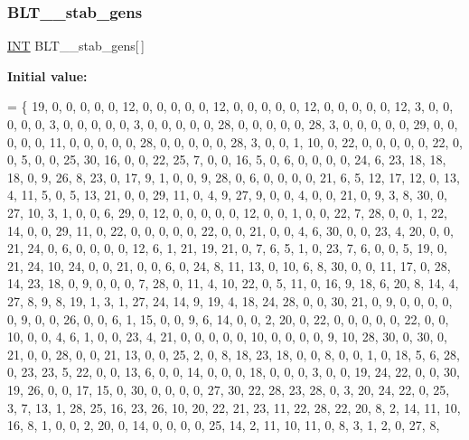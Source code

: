 \subsubsection{\texorpdfstring{B\+L\+T\+\_\+\_\+stab\+\_\+gens}{BLT\_31\_stab\_gens}}
{\footnotesize\ttfamily \mbox{\hyperlink{galois_8h_a09fddde158a3a20bd2dcadb609de11dc}{I\+NT}} B\+L\+T\+\_\+\_\+stab\+\_\+gens\mbox{[}$\,$\mbox{]}}

{\bfseries Initial value\+:}
\begin{DoxyCode}
= \{
19,  0,  0,  0,  0,  0, 12,  0,  0,  0,  0,  0, 12,  0,  0,  0,  0,  0, 12,  0,  0,  0,  0,  0, 12, 
 3,  0,  0,  0,  0,  0,  3,  0,  0,  0,  0,  0,  3,  0,  0,  0,  0,  0, 28,  0,  0,  0,  0,  0, 28, 
 3,  0,  0,  0,  0,  0, 29,  0,  0,  0,  0,  0, 11,  0,  0,  0,  0,  0, 28,  0,  0,  0,  0,  0, 28, 
 3,  0,  0,  1, 10,  0, 22,  0,  0,  0,  0,  0, 22,  0,  0,  5,  0,  0, 25, 30, 16,  0,  0, 22, 25, 
 7,  0,  0, 16,  5,  0,  6,  0,  0,  0,  0, 24,  6, 23, 18, 18, 18,  0,  9, 26,  8, 23,  0, 17,  9, 
 1,  0,  0,  9, 28,  0,  6,  0,  0,  0,  0, 21,  6,  5, 12, 17, 12,  0, 13,  4, 11,  5,  0,  5, 13, 
21,  0,  0, 29, 11,  0,  4,  9, 27,  9,  0,  0,  4,  0,  0, 21,  0,  9,  3,  8, 30,  0, 27, 10,  3, 
 1,  0,  0,  6, 29,  0, 12,  0,  0,  0,  0,  0, 12,  0,  0,  1,  0,  0, 22,  7, 28,  0,  0,  1, 22, 
14,  0,  0, 29, 11,  0, 22,  0,  0,  0,  0,  0, 22,  0,  0, 21,  0,  0,  4,  6, 30,  0,  0, 23,  4, 
20,  0,  0, 21, 24,  0,  6,  0,  0,  0,  0, 12,  6,  1, 21, 19, 21,  0,  7,  6,  5,  1,  0, 23,  7, 
 6,  0,  0,  5, 19,  0, 21, 24, 10, 24,  0,  0, 21,  0,  0,  6,  0, 24,  8, 11, 13,  0, 10,  6,  8, 
30,  0,  0, 11, 17,  0, 28, 14, 23, 18,  0,  9,  0,  0,  0,  7, 28,  0, 11,  4, 10, 22,  0,  5, 11, 
 0, 16,  9, 18,  6, 20,  8, 14,  4, 27,  8,  9,  8, 19,  1,  3,  1, 27, 24, 14,  9, 19,  4, 18, 24, 
28,  0,  0, 30, 21,  0,  9,  0,  0,  0,  0,  0,  9,  0,  0, 26,  0,  0,  6,  1, 15,  0,  0,  9,  6, 
14,  0,  0,  2, 20,  0, 22,  0,  0,  0,  0,  0, 22,  0,  0, 10,  0,  0,  4,  6,  1,  0,  0, 23,  4, 
21,  0,  0,  0,  0,  0, 10,  0,  0,  0,  0,  9, 10, 28, 30,  0, 30,  0, 21,  0,  0, 28,  0,  0, 21, 
13,  0,  0, 25,  2,  0,  8, 18, 23, 18,  0,  0,  8,  0,  0,  1,  0, 18,  5,  6, 28,  0, 23, 23,  5, 
22,  0,  0, 13,  6,  0,  0, 14,  0,  0,  0, 18,  0,  0,  0,  3,  0,  0, 19, 24, 22,  0,  0, 30, 19, 
26,  0,  0, 17, 15,  0, 30,  0,  0,  0,  0, 27, 30, 22, 28, 23, 28,  0,  3, 20, 24, 22,  0, 25,  3, 
 7, 13,  1, 28, 25, 16, 23, 26, 10, 20, 22, 21, 23, 11, 22, 28, 22, 20,  8,  2, 14, 11, 10, 16,  8, 
 1,  0,  0,  2, 20,  0, 14,  0,  0,  0,  0, 25, 14,  2, 11, 10, 11,  0,  8,  3,  1,  2,  0, 27,  8, 

\end{DoxyCode}
